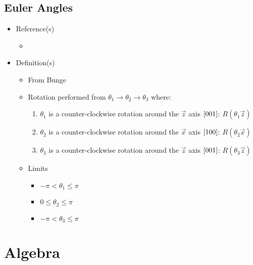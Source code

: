 \documentclass[letterpaper]{article}
\begin{document}
	\subsection{Euler Angles}
	\label{sec:eulerangles}
	\begin{itemize}
		\item Reference(s)
			\begin{itemize}
				\item \cite{Rollett2008}
			\end{itemize}
		\item Definition(s)
			\begin{itemize}
				\item From Bunge
				\item Rotation performed from $\theta_1 \rightarrow \theta_2 \rightarrow \theta_3$ where:
					\begin{enumerate}
						\item $\theta_1$ is a counter-clockwise rotation around the $\vec{z}$ axis $\left[ 001 \right]$: $R\left(\theta_1\vec{z}\right)$
						\item $\theta_2$ is a counter-clockwise rotation around the $\vec{x}$ axis $\left[ 100 \right]$: $R\left(\theta_2\vec{x}\right)$
						\item $\theta_3$ is a counter-clockwise rotation around the $\vec{z}$ axis $\left[ 001 \right]$: $R\left(\theta_3\vec{z}\right)$
					\end{enumerate}
				\item Limits
					\begin{itemize}
						\item $-\pi < \theta_1 \leq \pi$
						\item $0 \leq \theta_2 \leq \pi$
						\item $-\pi < \theta_3 \leq \pi$
					\end{itemize}
			\end{itemize}
	\end{itemize}


\newpage
	\section{Algebra}
	
\end{document}
